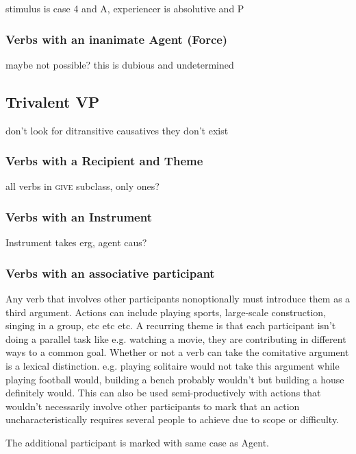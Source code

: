 \documentclass[smallroyalvopaper,9pt]{memoir} %
\begin{document}
stimulus is case 4 and A, experiencer is absolutive and P

\subsubsection{Verbs with an inanimate Agent (Force)}

maybe not possible? this is dubious and undetermined

\subsection{Trivalent VP}

don't look for ditransitive causatives they don't exist

\subsubsection{Verbs with a Recipient and Theme}

all verbs in \textsc{give} subclass, only ones?

\subsubsection{Verbs with an Instrument}

Instrument takes erg, agent caus?

\subsubsection{Verbs with an associative participant}

Any verb that involves other participants nonoptionally must introduce them as a third argument. Actions can include playing sports, large-scale construction, singing in a group, etc etc etc. A recurring theme is that each participant isn't doing a parallel task like e.g. watching a movie, they are contributing in different ways to a common goal.
Whether or not a verb can take the comitative argument is a lexical distinction. e.g. playing solitaire would not take this argument while playing football would, building a bench probably wouldn't but building a house definitely would. This can also be used semi-productively with actions that wouldn't necessarily involve other participants to mark that an action uncharacteristically requires several people to achieve due to scope or difficulty.

The additional participant is marked with same case as Agent.
\end{document}
